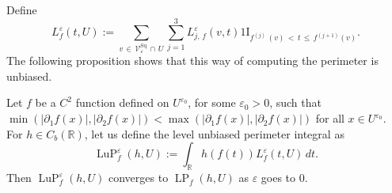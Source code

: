 \documentclass[10pt]{amsart}
\theoremstyle{definition}\newtheorem{defi}[theo]{Definition}\newtheorem{rema}[theo]{Remark}\newtheorem{exam}[theo]{Example}\newtheorem{exem}[theo]{Example}\newtheorem{nota}[theo]{Notation}
\newcommand{\R}{\mathbb{R}}
\newcommand{\ind}{{1\!\!\mathrm{I}}}
\newcommand{\eps}{\varepsilon}
\DeclareMathOperator{\LP}{LP}
\DeclareMathOperator{\LuP}{LuP}
\DeclareMathOperator{\Sq}{Sq}
\newcommand{\calV}{\mathcal{V}}
\begin{document}
Define
\[
L_f^\eps(t,U) := \sum_{v\,\in\,\calV^{\Sq}_\eps\,\cap\,U} \sum_{j=1}^3
L_{j,\,f}^\eps(v,t) \ind_{f^{(j)}\,(v)\,<\,t\,\leq\, f^{(j+1)}(v)}.
\]
The following proposition shows that this way of computing the perimeter is unbiased.

\begin{prop}\label{unbiased-perim:prop}

Let $f$ be a $C^2$ function defined on $U^{\eps_0}$, for some $\eps_0>0$, such that $\min (|\partial_1 f(x)|, |\partial_2 f(x)|)<\max (|\partial_1 f(x)|, |\partial_2 f(x)|)$ for all $x\in U^{\eps_0}$. For $h\in C_b(\R)$, let us define the level unbiased perimeter integral as
\[
\LuP_f^\eps(h,U) := \int_\R h(f(t)) L_f^\eps(t,U) \, dt.
\]
Then $\LuP_f^\eps(h,U)$ converges to $\LP_f(h,U)$ as $\eps$ goes to $0$.
\end{prop}
\end{document}
